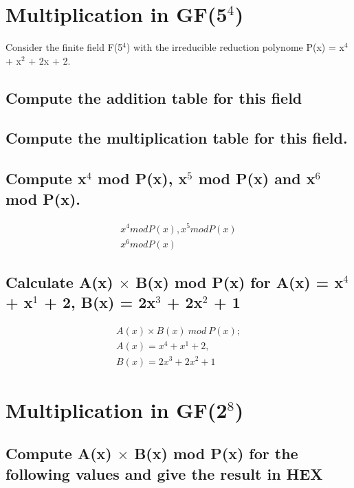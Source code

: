 \section{Multiplication in GF(5$^{4}$)}
Consider the finite field F(5$^{4}$) with the irreducible reduction polynome P(x) = x$^{4}$ + x$^{2}$ + 2x + 2.

\subsection{Compute the addition table for this field}
\label{section:2a}

\subsection{Compute the multiplication table for this field.}
\label{section:2b}

\subsection{Compute x$^{4}$ mod P(x), x$^{5}$ mod P(x) and x$^{6}$ mod P(x).}
\label{section:2c}
\begin{equation}
\begin{split}
x^{4} mod P(x), x^{5} mod P(x) \\ 
x^{6} mod P(x)
\end{split}
\end{equation}

\subsection{Calculate A(x) $\times$ B(x) mod P(x) for A(x) = x$^{4}$ + x$^{1}$ + 2, B(x) = 2x$^{3}$ + 2x$^{2}$ + 1}
\label{section:2d}
\begin{equation}
\begin{split}
A(x) \times B(x)~mod~P(x); \\
A(x) = x^{4} + x^{1} + 2, \\ 
B(x) = 2x^{3} + 2x^{2} + 1
\end{split}
\end{equation}

\section{Multiplication in GF(2$^{8}$)}

\subsection{Compute A(x) $\times$ B(x) mod P(x) for the following values and give the result in HEX}
\label{section:3a}

